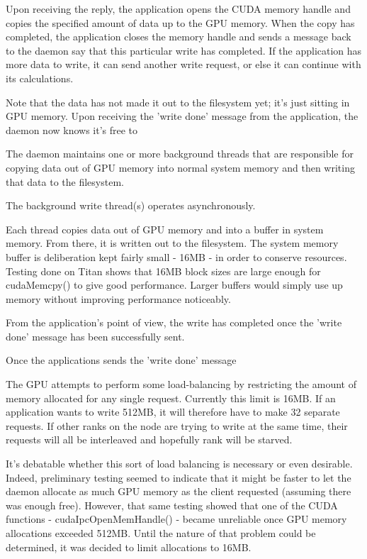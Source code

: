 Upon receiving the reply, the application opens the CUDA memory handle and copies the specified amount of data up to the GPU memory.  When the copy has completed, the application closes the memory handle and sends a message back to the daemon say that this particular write has completed.  If the application has more data to write, it can send another write request, or else it can continue with its calculations.

Note that the data has not made it out to the filesystem yet; it's just sitting in GPU memory.  Upon receiving the 'write done' message from the application, the daemon now knows it's free to 

The daemon maintains one or more background threads that are responsible for copying data out of GPU memory into normal system memory and then writing that data to the filesystem. 

The background write thread(s) operates asynchronously.

Each thread copies data out of GPU memory and into a buffer in system memory.  From there, it is written out to the filesystem.  The system memory buffer is deliberation kept fairly small - 16MB - in order to conserve resources.  Testing done on Titan shows that 16MB block sizes are large enough for cudaMemcpy() to give good performance.\cite{ac_guide}  Larger buffers would simply use up memory without improving performance noticeably. 




From the application's point of view, the write has completed once the 'write done' message has been successfully sent.


Once the applications sends the 'write done' message


The GPU attempts to perform some load-balancing by restricting the amount of memory allocated for any single request.  Currently this limit is 16MB.  If an application wants to write 512MB, it will therefore have to make 32 separate requests.  If other ranks on the node are trying to write at the same time, their requests will all be interleaved and hopefully rank will be starved.

It's debatable whether this sort of load balancing is necessary or even desirable.  Indeed, preliminary testing seemed to indicate that it might be faster to let the daemon allocate  as much GPU memory as the client requested (assuming there was enough free).  However, that same testing showed that one of the CUDA functions - cudaIpcOpenMemHandle() - became unreliable once GPU memory allocations exceeded 512MB.  Until the nature of that problem could be determined, it was decided to limit allocations to 16MB.


